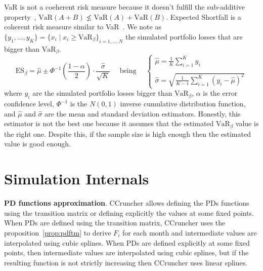 \documentclass[11pt,fleqn]{book} %
\begin{document}
VaR is not a coeherent risk measure because it doesn't fulfill the sub-additive 
property~\cite{var:varbad}, $\text{VaR}(A+B) \nleq \text{VaR}(A)+\text{VaR}(B)$. 
Expected Shortfall is a coherent risk measure similar to VaR~\cite{var:eshortfall}.
We note as 
$\{y_1, \ldots, y_K\} = \{x_i \mid x_i \ge \text{VaR}_{\beta} \}_{i=1,\dots,N}$ 
the simulated portfolio losses that are bigger than $\text{VaR}_{\beta}$.
\begin{displaymath}
	\text{ES}_{\beta} = \widehat{\mu} \pm \Phi^{-1}\left(\frac{1-\alpha}{2}\right) \cdot \frac{\widehat{\sigma}}{\sqrt{K}}
	\quad \text{ being } \quad
	\left\{
	\begin{array}{l}
		\displaystyle
		\widehat{\mu} = \frac{1}{K} \sum_{i=1}^{K} y_i \\
		\\
		\displaystyle
		\widehat{\sigma} =
		\sqrt{\frac{1}{K-1} \sum_{i=1}^{K} \left( y_i - \widehat{\mu} \right)^2}
	\end{array}
	\right.
\end{displaymath}
where $y_i$ are the simulated portfolio losses bigger than $\text{VaR}_{\beta}$, 
$\alpha$ is the error confidence level, $\Phi^{-1}$ is the $N(0,1)$ 
inverse cumulative distribution function, and $\widehat{\mu}$ and 
$\widehat{\sigma}$ are the mean and standard deviation estimators.
Honestly, this estimator is not the best one because it assumes that
the estimated $\text{VaR}_{\beta}$ value is the right one. Despite this, 
if the sample size is high enough then the estimated value is good enough.

\section{Simulation Internals}

\textbf{PD functions approximation}. CCruncher allows defining the PDs
functions using the transition matrix or defining explicitly the values
at some fixed points. When PDs are defined using the transition matrix, 
CCruncher uses the proposition~\ref{prop:pdftm} to derive $F_i$ for each 
month and intermediate values are interpolated using cubic splines. 
When PDs are defined explicitly at some fixed points, then intermediate 
values are interpolated using cubic splines, but if the resulting function 
is not strictly increasing then CCruncher uses linear splines.
\end{document}
